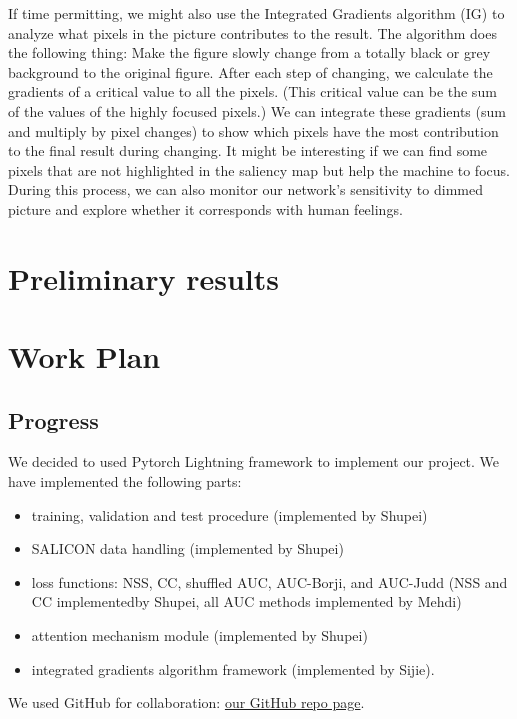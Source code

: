 \documentclass[12pt]{article}
\begin{document}
If time permitting, we might also use the Integrated Gradients algorithm (IG) \cite{sundararajan2017axiomatic} to analyze what pixels in the picture contributes to the result. The algorithm does the following thing: Make the figure slowly change from a totally black or grey background to the original figure.
After each step of changing, we calculate the gradients of a critical value to all the pixels. (This critical value can be the sum of the values of the highly focused pixels.) We can integrate these gradients (sum and multiply by pixel changes) to show which pixels have the most contribution to the final result during changing.
It might be interesting if we can find some pixels that are not highlighted in the saliency map but help the machine to focus. 
During this process, we can also monitor our network's sensitivity to dimmed picture and explore whether it corresponds with human feelings. 

\section{Preliminary results}



\section{Work Plan}
\subsection{Progress}
We decided to used Pytorch Lightning framework \cite{falcon2019pytorch} to implement our project.
We have implemented the following parts:
\begin{itemize}
    \item training, validation and test procedure (implemented by Shupei)
    \item SALICON data handling (implemented by Shupei)
    \item loss functions: NSS, CC, shuffled AUC, AUC-Borji, and AUC-Judd (NSS and CC implementedby Shupei, all AUC methods implemented by Mehdi)
    \item attention mechanism module (implemented by Shupei)
    \item integrated gradients algorithm framework (implemented by Sijie).
\end{itemize}
We used GitHub for collaboration: \href{https://github.com/Freddiechang/CMPUT566}{our GitHub repo page}.
\end{document}
